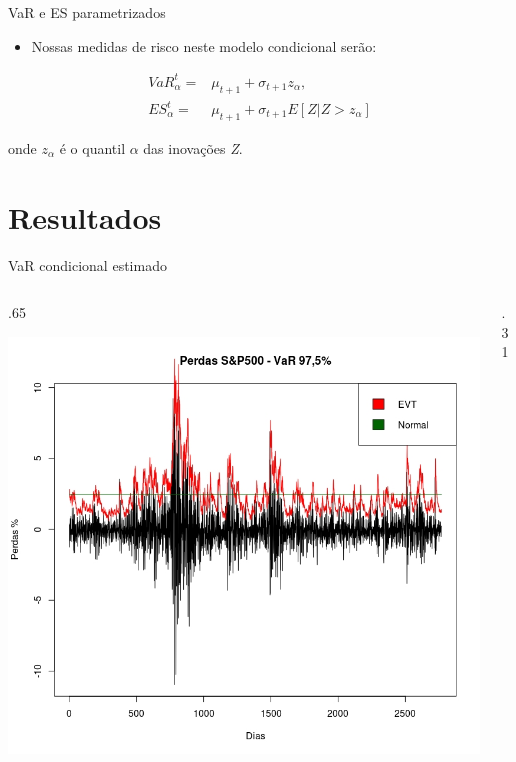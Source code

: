 \documentclass[ignorenonframetext,]{beamer}
\providecommand{\tightlist}{%
\setlength{\itemsep}{0pt}\setlength{\parskip}{0pt}}
\def\begincols{\begin{columns}}
\def\begincol{\begin{column}}
\def\endcol{\end{column}}
\def\endcols{\end{columns}}
\begin{document}
\begin{frame}{VaR e ES parametrizados}

\begin{itemize}
\tightlist
\item
  Nossas medidas de risco neste modelo condicional serão:
\end{itemize}

\begin{align*}
VaR_\alpha^t=&\mu_{t+1}+\sigma_{t+1}z_\alpha, \\
ES_\alpha^t=&\mu_{t+1}+\sigma_{t+1}E[Z | Z>z_\alpha]
\end{align*}

onde \(z_\alpha\) é o quantil \(\alpha\) das inovações \emph{Z}.

\end{frame}

\section{Resultados}\label{resultados}

\begin{frame}{VaR condicional estimado}

\begincols

\begincol{.65\textwidth}

\includegraphics{artigo-apresentacao-var.jpeg}

\endcol

\begincol{.31\textwidth}



\endcol

\endcols

\end{frame}
\end{document}
